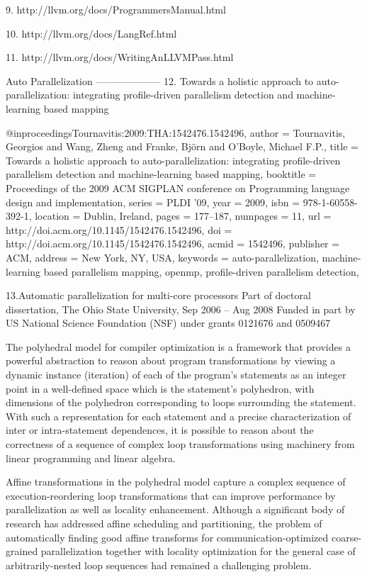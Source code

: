 9. http://llvm.org/docs/ProgrammersManual.html

10. http://llvm.org/docs/LangRef.html

11. http://llvm.org/docs/WritingAnLLVMPass.html

Auto Parallelization
--------------------
12. Towards a holistic approach to auto-parallelization: integrating profile-driven parallelism detection and machine-learning based mapping

@inproceedings{Tournavitis:2009:THA:1542476.1542496,
    author = {Tournavitis, Georgios and Wang, Zheng and Franke, Bj\"{o}rn and O'Boyle, Michael F.P.},
    title = {Towards a holistic approach to auto-parallelization: integrating profile-driven parallelism detection and machine-learning based mapping},
    booktitle = {Proceedings of the 2009 ACM SIGPLAN conference on Programming language design and implementation},
    series = {PLDI '09},
    year = {2009},
    isbn = {978-1-60558-392-1},
    location = {Dublin, Ireland},
    pages = {177--187},
    numpages = {11},
    url = {http://doi.acm.org/10.1145/1542476.1542496},
    doi = {http://doi.acm.org/10.1145/1542476.1542496},
    acmid = {1542496},
    publisher = {ACM},
    address = {New York, NY, USA},
    keywords = {auto-parallelization, machine-learning based parallelism mapping, openmp, profile-driven parallelism detection},
} 


13.Automatic parallelization for multi-core processors
Part of doctoral dissertation, The Ohio State University, Sep 
2006 -- Aug 2008
Funded in part by US National Science Foundation (NSF) under 
grants 0121676 and 0509467

The polyhedral model for compiler optimization is a framework that 
provides a powerful abstraction to reason about program transformations 
by viewing a dynamic instance (iteration) of each of the program's 
statements as an integer point in a well-defined space which is the 
statement's  polyhedron, with dimensions of the polyhedron corresponding 
to loops surrounding the statement. With such a representation for each 
statement and a precise characterization of inter or intra-statement 
dependences, it is possible to reason about the correctness of a sequence 
of complex loop transformations using machinery from linear programming 
and linear algebra.

Affine transformations in the polyhedral model capture a complex 
sequence of execution-reordering loop transformations that can improve 
performance by parallelization as well as locality enhancement. Although 
a significant body of research has addressed affine scheduling and 
partitioning, the problem of automatically finding good affine transforms 
for communication-optimized coarse-grained parallelization together with 
locality optimization for the general case of arbitrarily-nested loop 
sequences had remained a challenging problem.

